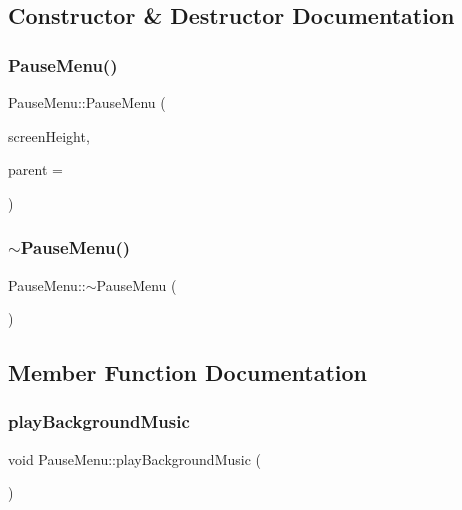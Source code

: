 \subsection{Constructor \& Destructor Documentation}
\mbox{\label{class_pause_menu_aa05ad1aa7b76298fb296d65a41ca2f9b}} 
\subsubsection{\texorpdfstring{PauseMenu()}{PauseMenu()}}
{\footnotesize\ttfamily Pause\+Menu\+::\+Pause\+Menu (\begin{DoxyParamCaption}\item[{int}]{screen\+Height,  }\item[{Q\+Widget $\ast$}]{parent = {} }\end{DoxyParamCaption})\hspace{0.3cm}{\ttfamily [explicit]}}

\mbox{\label{class_pause_menu_af30f0b8f5f59c6779434295a731b0e35}} 
\subsubsection{\texorpdfstring{$\sim$PauseMenu()}{~PauseMenu()}}
{\footnotesize\ttfamily Pause\+Menu\+::$\sim$\+Pause\+Menu (\begin{DoxyParamCaption}{ }\end{DoxyParamCaption})}



\subsection{Member Function Documentation}
\mbox{\label{class_pause_menu_ae1b441da8a1a0ae3ffc64a8ce89432f0}} 
\subsubsection{\texorpdfstring{playBackgroundMusic}{playBackgroundMusic}}
{\footnotesize\ttfamily void Pause\+Menu\+::play\+Background\+Music (\begin{DoxyParamCaption}{ }\end{DoxyParamCaption})\hspace{0.3cm}{\ttfamily [signal]}}



